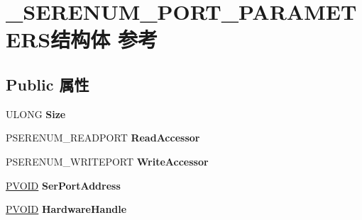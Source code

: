 \hypertarget{struct___s_e_r_e_n_u_m___p_o_r_t___p_a_r_a_m_e_t_e_r_s}{}\section{\+\_\+\+S\+E\+R\+E\+N\+U\+M\+\_\+\+P\+O\+R\+T\+\_\+\+P\+A\+R\+A\+M\+E\+T\+E\+R\+S结构体 参考}
\label{struct___s_e_r_e_n_u_m___p_o_r_t___p_a_r_a_m_e_t_e_r_s}
\subsection*{Public 属性}
\begin{DoxyCompactItemize}
\item 
\mbox{\label{struct___s_e_r_e_n_u_m___p_o_r_t___p_a_r_a_m_e_t_e_r_s_a1e800be8a99d952cc7d0ed94b86cb82e}} 
U\+L\+O\+NG {\bfseries Size}
\item 
\mbox{\label{struct___s_e_r_e_n_u_m___p_o_r_t___p_a_r_a_m_e_t_e_r_s_afcde8d4c2fc05ef1e2e7cfe227389393}} 
P\+S\+E\+R\+E\+N\+U\+M\+\_\+\+R\+E\+A\+D\+P\+O\+RT {\bfseries Read\+Accessor}
\item 
\mbox{\label{struct___s_e_r_e_n_u_m___p_o_r_t___p_a_r_a_m_e_t_e_r_s_adf29faec8828064797c7a40dde39f2ce}} 
P\+S\+E\+R\+E\+N\+U\+M\+\_\+\+W\+R\+I\+T\+E\+P\+O\+RT {\bfseries Write\+Accessor}
\item 
\mbox{\label{struct___s_e_r_e_n_u_m___p_o_r_t___p_a_r_a_m_e_t_e_r_s_a1430d9b6657349257dae1d31119e6b67}} 
\hyperlink{interfacevoid}{P\+V\+O\+ID} {\bfseries Ser\+Port\+Address}
\item 
\mbox{\label{struct___s_e_r_e_n_u_m___p_o_r_t___p_a_r_a_m_e_t_e_r_s_a751b0fb53fe6f3418110292c64d47ae8}} 
\hyperlink{interfacevoid}{P\+V\+O\+ID} {\bfseries Hardware\+Handle}
\item 
\mbox{\label{struct___s_e_r_e_n_u_m___p_o_r_t___p_a_r_a_m_e_t_e_r_s_af7e07ccfa8f4120eb0ef5015b4f6b9a6}} 

\end{DoxyCompactItemize}
